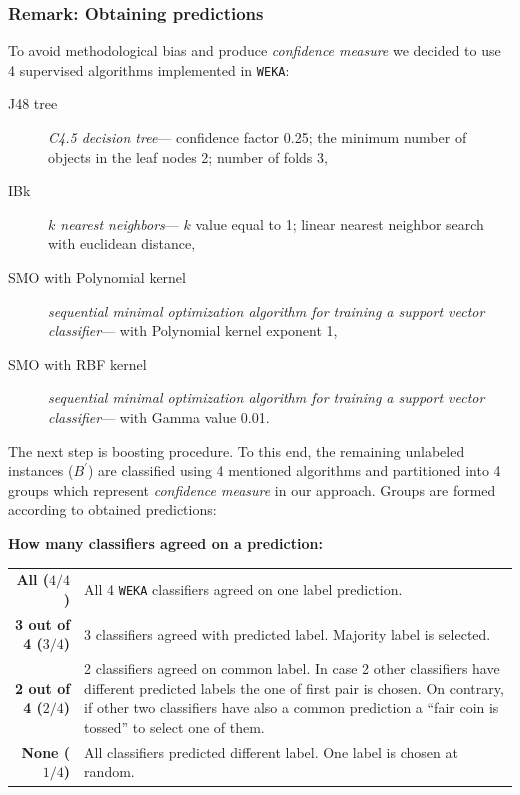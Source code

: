\documentclass[12pt, a4paper, pdflatex]{report}
\begin{document}
\subsubsection{Remark: Obtaining predictions}
To avoid methodological bias and produce \emph{confidence measure} we decided to use 4 supervised algorithms implemented in \texttt{WEKA}:
\begin{description}
\item[J48 tree] \emph{C4.5 decision tree}--- confidence factor 0.25; the minimum number of objects in the leaf nodes 2; number of folds 3,
\item[IBk] \emph{$k$ nearest neighbors}--- $k$ value equal to 1; linear nearest neighbor search with euclidean distance,
\item[SMO with Polynomial kernel] \emph{sequential minimal optimization algorithm for training a support vector classifier}--- with Polynomial kernel exponent 1,
\item[SMO with RBF kernel] \emph{sequential minimal optimization algorithm for training a support vector classifier}--- with Gamma value 0.01.
\end{description}

The next step is boosting procedure. To this end, the remaining unlabeled instances ($B^{\prime}$) are classified using 4 mentioned algorithms and partitioned into 4 groups which represent \emph{confidence measure} in our approach. Groups are formed according to obtained predictions:\\[-0.6cm]
\begin{center}\textbf{How many classifiers agreed on a prediction:}\end{center}
\begin{tabular}{rp{12cm}}
\textbf{All ($4/4$)} & All 4 \texttt{WEKA} classifiers agreed on one label prediction.\\
\textbf{3 out of 4 ($3/4$)} & 3 classifiers agreed with predicted label. Majority label is selected.\\
\textbf{2 out of 4 ($2/4$)} & 2 classifiers agreed on common label. In case 2 other classifiers have different predicted labels the one of first pair is chosen. On contrary, if other two classifiers have also a common prediction a ``fair coin is tossed'' to select one of them.\\
\textbf{None ($1/4$)} & All classifiers predicted different label. One label is chosen at random.\\[0.4cm]
\end{tabular}
\end{document}
